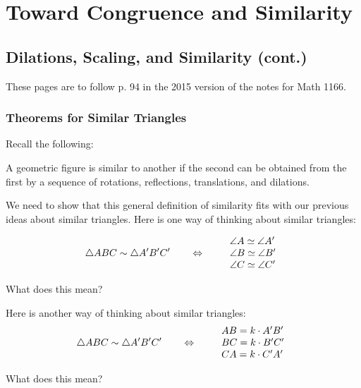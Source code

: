
\newpage

\setcounter{chapter}{3}
\chapter{Toward Congruence and Similarity}

\setcounter{section}{3}
\section{Dilations, Scaling, and Similarity (cont.)}
These pages are to follow p. 94 in the 2015 version of the notes for Math 1166.  


\subsection{Theorems for Similar Triangles}

Recall the following:  
\begin{definition}
A geometric figure is similar to another if the second can be obtained
from the first by a sequence of rotations, reflections, translations, and dilations.
\end{definition}

We need to show that this general definition of similarity fits with our previous ideas about similar triangles.  Here is one way of thinking about similar triangles:  

\[
\triangle ABC \sim \triangle A'B'C' \qquad\Leftrightarrow \qquad\begin{array}{l}
\angle A \simeq \angle A'\\
\angle B \simeq \angle B' \\
\angle C \simeq \angle C'
\end{array}
\]

\begin{question} 
What does this mean?  
\end{question}
\QM

Here is another way of thinking about similar triangles:  
\[
\triangle ABC \sim \triangle A'B'C' \qquad\Leftrightarrow \qquad
\begin{array}{l}
AB = k\cdot A'B'\\
BC = k\cdot B'C' \\
CA = k\cdot C'A'
\end{array}
\]

\begin{question} 
What does this mean?  
\end{question}
\QM



